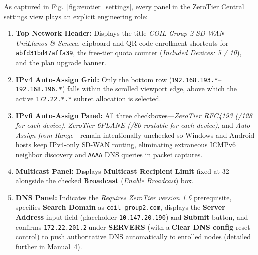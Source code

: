 As captured in Fig.~\ref{fig:zerotier_settings}, every panel in the ZeroTier Central settings view plays an explicit engineering role:
\begin{enumerate}
    \item \textbf{Top Network Header:} Displays the title \textit{COIL Group 2 SD-WAN - UniLlanos \& Seneca}, clipboard and QR-code enrollment shortcuts for \texttt{abfd31bd47affa39}, the free-tier quota counter (\textit{Included Devices: 5 / 10}), and the plan upgrade banner.
    \item \textbf{IPv4 Auto-Assign Grid:} Only the bottom row (\nolinkurl{192.168.193.*}--\nolinkurl{192.168.196.*}) falls within the scrolled viewport edge, above which the active \nolinkurl{172.22.*.*} subnet allocation is selected.
    \item \textbf{IPv6 Auto-Assign Panel:} All three checkboxes---\textit{ZeroTier RFC4193 (/128 for each device)}, \textit{ZeroTier 6PLANE (/80 routable for each device)}, and \textit{Auto-Assign from Range}---remain intentionally unchecked so Windows and Android hosts keep IPv4-only SD-WAN routing, eliminating extraneous ICMPv6 neighbor discovery and \texttt{AAAA} DNS queries in packet captures.
    \item \textbf{Multicast Panel:} Displays \textbf{Multicast Recipient Limit} fixed at \num{32} alongside the checked \textbf{Broadcast} (\textit{Enable Broadcast}) box.
    \item \textbf{DNS Panel:} Indicates the \textit{Requires ZeroTier version 1.6} prerequisite, specifies \textbf{Search Domain} as \nolinkurl{coil-group2.com}, displays the \textbf{Server Address} input field (placeholder \nolinkurl{10.147.20.190}) and \textbf{Submit} button, and confirms \nolinkurl{172.22.201.2} under \textbf{SERVERS} (with a \textbf{Clear DNS config} reset control) to push authoritative DNS automatically to enrolled nodes (detailed further in Manual~4).
\end{enumerate}

